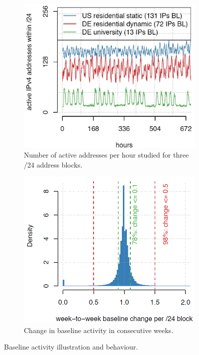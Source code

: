 \documentclass[11pt,twoside,a4paper]{article}
\begin{document}
\begin{figure}[h!]
  \centering
  \begin{subfigure}[b]{0.4\linewidth}
    \includegraphics[width=\linewidth]{1a.png}
    \caption{Number of active addresses per hour studied for three /24 address blocks.}
  \end{subfigure}
  \begin{subfigure}[b]{0.4\linewidth} \hspace{6mm}
    \includegraphics[width=\linewidth]{1c.png}
    \caption{Change in baseline activity in consecutive weeks.}
  \end{subfigure}
  \caption{Baseline activity illustration and behaviour.}
  \label{fig:BaselineDef}
\end{figure}
\end{document}
